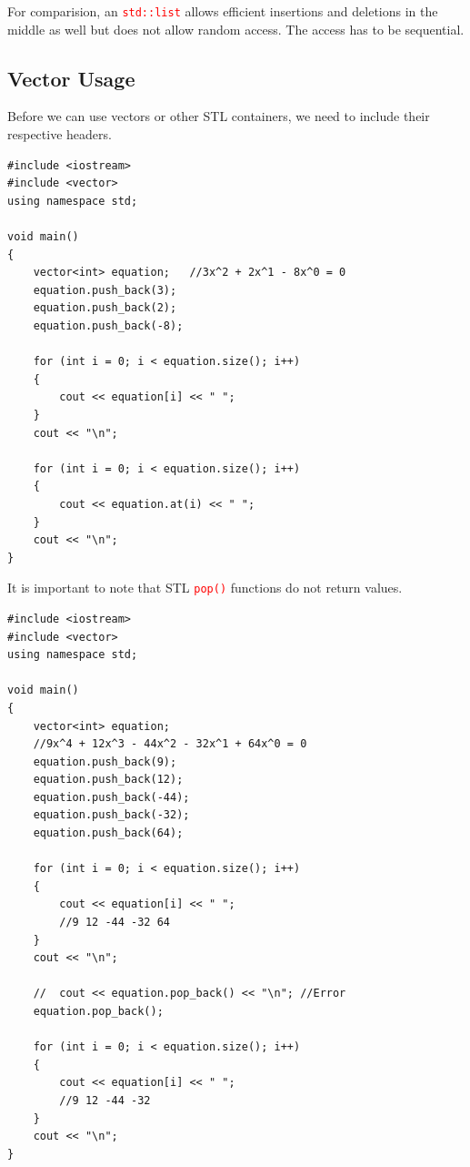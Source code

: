 \documentclass[12pt]{article}
\begin{document}
\noindent For comparision, an \textcolor{red}{\texttt{std::list}} allows efficient insertions and deletions in the middle as well but does not allow random access. The access has to be 
sequential.

\newpage
{}
\subsection*{Vector Usage}

\noindent Before we can use vectors or other STL containers, we need to include their respective headers. 

\begin{verbatim}
#include <iostream>
#include <vector>
using namespace std;

void main()
{
    vector<int> equation;   //3x^2 + 2x^1 - 8x^0 = 0
    equation.push_back(3);
    equation.push_back(2);
    equation.push_back(-8);

    for (int i = 0; i < equation.size(); i++)
    {
        cout << equation[i] << " ";
    }
    cout << "\n";

    for (int i = 0; i < equation.size(); i++)
    {
        cout << equation.at(i) << " ";
    }
    cout << "\n";
}
\end{verbatim}

\newpage

\noindent It is important to note that STL \textcolor{red}{\texttt{pop()}} functions do not return values.

\begin{verbatim}
#include <iostream>
#include <vector>
using namespace std;

void main()
{
    vector<int> equation;
    //9x^4 + 12x^3 - 44x^2 - 32x^1 + 64x^0 = 0
    equation.push_back(9);
    equation.push_back(12);
    equation.push_back(-44);
    equation.push_back(-32);
    equation.push_back(64);

    for (int i = 0; i < equation.size(); i++)
    {
        cout << equation[i] << " ";
        //9 12 -44 -32 64
    }
    cout << "\n";

    //  cout << equation.pop_back() << "\n"; //Error
    equation.pop_back();

    for (int i = 0; i < equation.size(); i++)
    {
        cout << equation[i] << " ";
        //9 12 -44 -32
    }
    cout << "\n";
}
\end{verbatim}

\newpage
\end{document}
